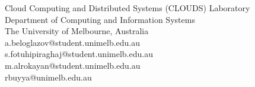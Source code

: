 Cloud Computing and Distributed Systems (CLOUDS) Laboratory\\
Department of Computing and Information Systems\\
The University of Melbourne, Australia\\
a.beloglazov@student.unimelb.edu.au\\
s.fotuhipiraghaj@student.unimelb.edu.au\\
m.alrokayan@student.unimelb.edu.au\\
rbuyya@unimelb.edu.au
